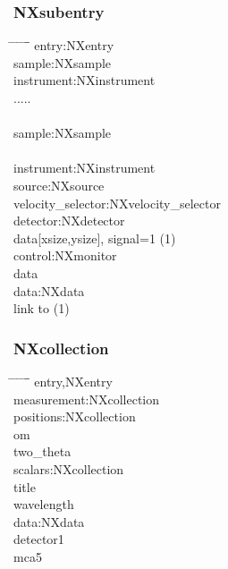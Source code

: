 \documentclass{beamer}
\begin{document}
\begin{frame} \frametitle{NXsubentry}
\begin{tabbing}
\hspace*{1cm} \= \hspace*{1cm} \= \hspace*{1cm} \= \hspace*{1cm} \= \hspace*{1cm} \= \hspace*{1cm}\= \kill
entry:NXentry \\
\>sample:NXsample\\
\>instrument:NXinstrument\\
\>.....\\
 \\
 \>  \>sample:NXsample \\
\\
\> \>instrument:NXinstrument\\
\> \> \> source:NXsource\\
\> \> \> velocity\_selector:NXvelocity\_selector\\
\> \> \> detector:NXdetector \\
\> \> \> \>data[xsize,ysize], signal=1 (1)\\
\> \>control:NXmonitor\\
\> \> \>data\\
\> \>data:NXdata\\
\> \> \> link to (1)\\
\end{tabbing}
\end{frame}

\begin{frame} \frametitle{NXcollection}
\begin{tabbing}
\hspace*{1cm} \= \hspace*{1cm} \= \hspace*{1cm} \= \hspace*{1cm} \= \hspace*{1cm} \= \hspace*{1cm}\= \kill
\>entry,NXentry\\
\> \>measurement:NXcollection\\
\> \> \>positions:NXcollection\\
\> \> \> \>om \\
\> \> \> \>two\_theta\\
\> \> \>scalars:NXcollection\\
\> \> \> \>title\\
\> \> \> \>wavelength\\
\> \> \>data:NXdata\\
\> \> \> \>detector1\\
\> \> \> \>mca5\\
\end{tabbing}
\end{frame}
\end{document}
